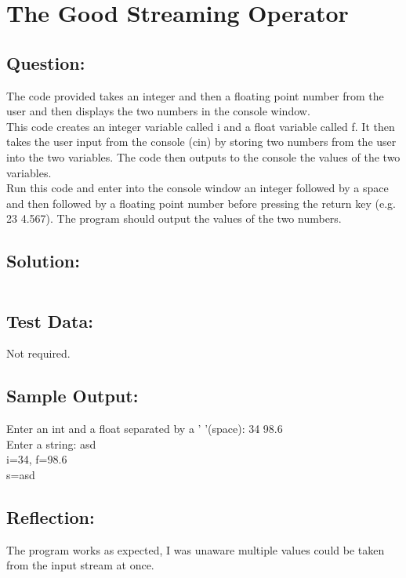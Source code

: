 \documentclass[Lab-B.tex]{subfiles}
\begin{document}
    \section{The Good Streaming Operator}
        \subsection*{Question:}
        The code provided takes an integer and then a floating point number from the user and then displays the two numbers in the console window. \\
        
        This code creates an integer variable called i and a float variable called f. 
        It then takes the user input from the console (cin) by storing two numbers from the user into the two variables. 
        The code then outputs to the console the values of the two variables. \\
        
        Run this code and enter into the console window an integer followed by a space and then followed by a floating point number before pressing the return key (e.g. 23  4.567). 
        The program should output the values of the two numbers.
            
        \subsection*{Solution:}
            \inputminted{cpp}{../01-Good-Streaming/Good-Streaming.cpp}%

        \subsection*{Test Data:}
            Not required.
        
        \subsection*{Sample Output:}
            Enter an int and a float separated by a ' '(space): 34 98.6\\
            Enter a string: asd\\
            i=34, f=98.6\\
            s=asd\\      

        \subsection*{Reflection:}
            The program works as expected, I was unaware multiple values could be taken
            from the input stream at once.
\end{document}
